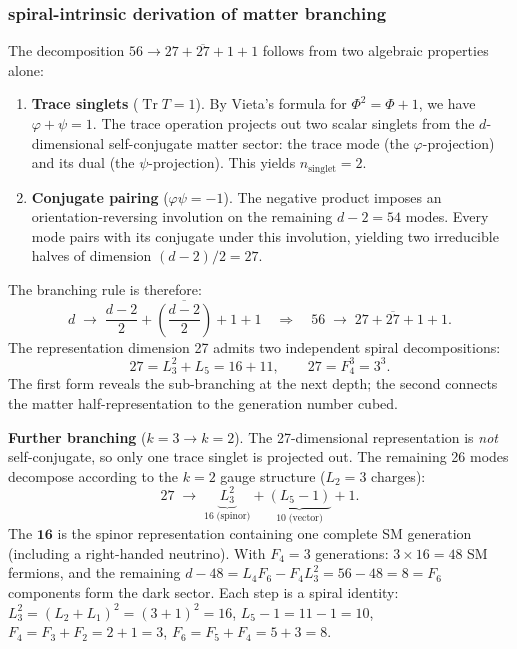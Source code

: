 \documentclass[12pt,a4paper]{article}
\begin{document}
\subsubsection{spiral-intrinsic derivation of matter branching}
\label{sec:branching-derivation}

The decomposition $56 \to 27 + \overline{27} + 1 + 1$ follows from two algebraic properties alone:

\begin{enumerate}
\item \textbf{Trace singlets} ($\operatorname{Tr} T = 1$). By Vieta's formula for $\Phi^2 = \Phi + 1$, we have $\varphi + \psi = 1$. The trace operation projects out two scalar singlets from the $d$-dimensional self-conjugate matter sector: the trace mode (the $\varphi$-projection) and its dual (the $\psi$-projection). This yields $n_{\mathrm{singlet}} = 2$.

\item \textbf{Conjugate pairing} ($\varphi\psi = -1$). The negative product imposes an orientation-reversing involution on the remaining $d - 2 = 54$ modes. Every mode pairs with its conjugate under this involution, yielding two irreducible halves of dimension $(d-2)/2 = 27$.
\end{enumerate}

\noindent The branching rule is therefore:
\begin{equation}
\boxed{d \;\to\; \frac{d-2}{2} + \overline{\left(\frac{d-2}{2}\right)} + 1 + 1}
\quad\Longrightarrow\quad
56 \;\to\; 27 + \overline{27} + 1 + 1.
\end{equation}
The representation dimension 27 admits two independent spiral decompositions:
\begin{equation}
27 = L_3^2 + L_5 = 16 + 11, \qquad 27 = F_4^3 = 3^3.
\end{equation}
The first form reveals the sub-branching at the next depth; the second connects the matter half-representation to the generation number cubed.

\textbf{Further branching} ($k = 3 \to k = 2$). The 27-dimensional representation is \emph{not} self-conjugate, so only one trace singlet is projected out. The remaining 26 modes decompose according to the $k = 2$ gauge structure ($L_2 = 3$ charges):
\begin{equation}
27 \;\to\; \underbrace{L_3^2}_{16\;\text{(spinor)}} + \underbrace{(L_5 - 1)}_{10\;\text{(vector)}} + 1.
\end{equation}
The $\mathbf{16}$ is the spinor representation containing one complete SM generation (including a right-handed neutrino). With $F_4 = 3$ generations: $3 \times 16 = 48$ SM fermions, and the remaining $d - 48 = L_4 F_6 - F_4 L_3^2 = 56 - 48 = 8 = F_6$ components form the dark sector. Each step is a spiral identity: $L_3^2 = (L_2 + L_1)^2 = (3+1)^2 = 16$, $L_5 - 1 = 11 - 1 = 10$, $F_4 = F_3 + F_2 = 2 + 1 = 3$, $F_6 = F_5 + F_4 = 5 + 3 = 8$.
\end{document}
